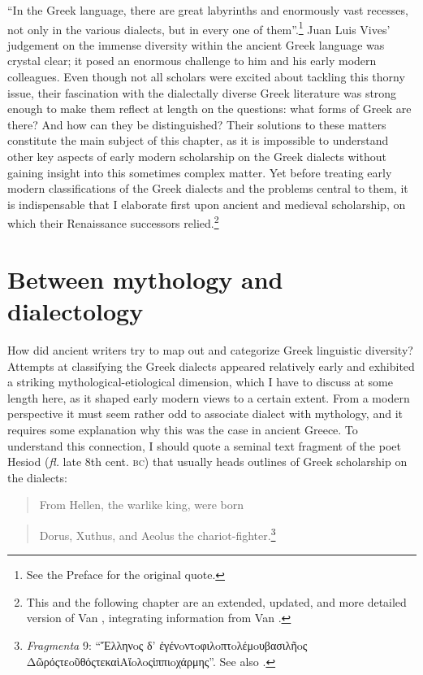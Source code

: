 “In the Greek language, there are great labyrinths and enormously vast recesses, not only in the various dialects, but in every one of them”.\footnote{See the Preface for the original quote.} Juan Luis Vives’ judgement on the immense diversity within the ancient Greek language was crystal clear; it posed an enormous challenge to him and his early modern colleagues. Even though not all scholars were excited about tackling this thorny issue, their fascination with the dialectally diverse Greek literature was strong enough to make them reflect at length on the questions: what forms of Greek are there? And how can they be distinguished? Their solutions to these matters constitute the main subject of this chapter, as it is impossible to understand other key aspects of early modern scholarship on the Greek dialects without gaining insight into this sometimes complex matter. Yet before treating early modern classifications of the Greek dialects and the problems central to them, it is indispensable that I elaborate first upon ancient and medieval scholarship, on which their Renaissance successors relied.\footnote{This and the following chapter are an extended, updated, and more detailed version of Van \citet{Rooy2016a}, integrating information from Van \citet{Rooy2018b}.}

\section{Between mythology and dialectology}

How did ancient writers try to map out and categorize Greek linguistic diversity? Attempts at classifying the Greek dialects appeared relatively early and exhibited a striking mythological-etiological dimension, which I have to discuss at some length here, as it shaped early modern views to a certain extent. From a modern perspective it must seem rather odd to associate dialect with mythology, and it requires some explanation why this was the case in ancient Greece. To understand this connection, I should quote a seminal text fragment of the poet Hesiod (\textit{fl.} late 8th cent. \textsc{bc}) that usually heads outlines of Greek scholarship on the dialects:

\begin{quote}
From Hellen, the warlike king, were born
\end{quote}

\begin{quote}
Dorus, Xuthus, and Aeolus the chariot-fighter.\footnote{\textit{Fragmenta} 9: “Ἕλληνoς δ’ ἐγένoντoφιλoπτoλέμoυβασιλῆoς {\textbar} Δῶρόςτε\Xi oῦθόςτεκαὶAἴoλoςἱππιoχάρμης”. See also \citet[64]{Hainsworth1967}.}
\end{quote}

